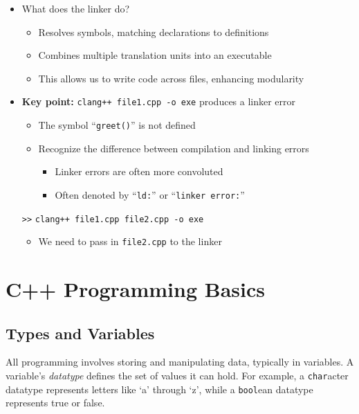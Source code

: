 \documentclass{article}
\begin{document}
\begin{itemize}
	\item What does the linker do? \begin{itemize}
		\item Resolves symbols, matching declarations to definitions
		\item Combines multiple translation units into an executable
		\item This allows us to write code across files, enhancing modularity
	\end{itemize}
	
	
	
	

	\item \textbf{Key point:} \texttt{clang++ file1.cpp -o exe} produces a linker error \begin{itemize}
		\item The symbol ``\texttt{greet()}'' is not defined
		\item Recognize the difference between compilation and linking errors \begin{itemize}
			\item Linker errors are often more convoluted
			\item Often denoted by ``\texttt{ld:}'' or ``\texttt{linker error:}'' 
		\end{itemize}
	\end{itemize}
	\item[\texttt{>>}] \texttt{clang++ file1.cpp file2.cpp -o exe} \begin{itemize}
		\item We need to pass in \texttt{file2.cpp} to the linker
	\end{itemize}
\end{itemize}

\section{C++ Programming Basics}

\subsection{Types and Variables}

\noindent
All programming involves storing and manipulating data, typically in variables. A variable's \textit{datatype} defines the set of values it can hold. For example, a \texttt{char}acter datatype represents letters like `a' through `z', while a \texttt{bool}ean datatype represents true or false.
\end{document}
